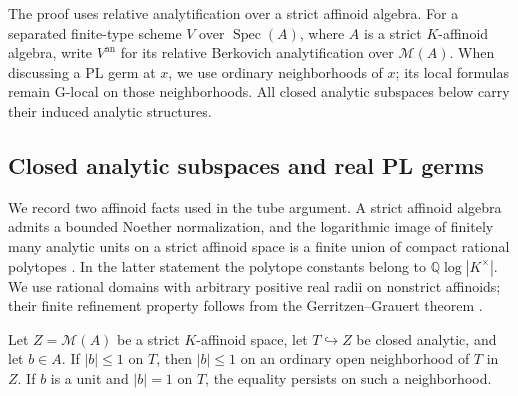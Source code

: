 The proof uses relative analytification over a strict affinoid algebra. For a separated finite-type scheme $V$ over $\operatorname{Spec}(A)$, where $A$ is a strict $K$-affinoid algebra, write $V^{\mathrm{an}}$ for its relative Berkovich analytification over $\mathcal M(A)$. When discussing a PL germ at $x$, we use ordinary neighborhoods of $x$; its local formulas remain G-local on those neighborhoods. All closed analytic subspaces below carry their induced analytic structures.

\subsection{Closed analytic subspaces and real PL germs}\label{sec:supplied-p061-closed-subspaces}

We record two affinoid facts used in the tube argument. A strict affinoid algebra admits a bounded Noether normalization, and the logarithmic image of finitely many analytic units on a strict affinoid space is a finite union of compact rational polytopes \cite[Theorem~5.18]{JonssonHorawa20}\cite[Theorem~3.2]{Ducros12Polytopes}. In the latter statement the polytope constants belong to $\mathbb Q\log|K^\times|$. We use rational domains with arbitrary positive real radii on nonstrict affinoids; their finite refinement property follows from the Gerritzen--Grauert theorem \cite[Theorem~3.1]{Temkin2005GG}.

\begin{lemma}\label{lem:supplied-p061-unit-norm-tube}
Let $Z=\mathcal M(A)$ be a strict $K$-affinoid space, let $T\hookrightarrow Z$ be closed analytic, and let $b\in A$. If $|b|\leq1$ on $T$, then $|b|\leq1$ on an ordinary open neighborhood of $T$ in $Z$. If $b$ is a unit and $|b|=1$ on $T$, the equality persists on such a neighborhood.
\end{lemma}

